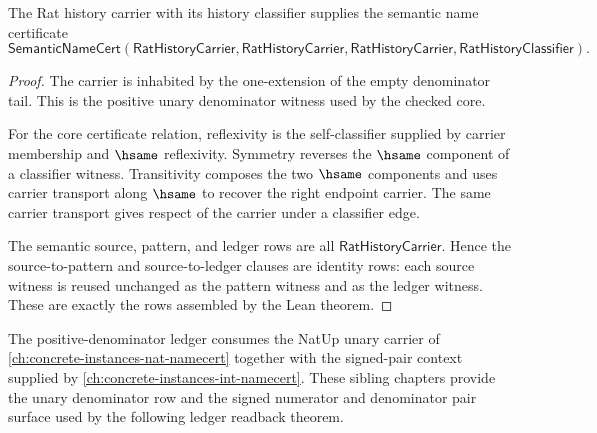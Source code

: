 



\begin{theorem}
\label{thm:rat-history-semantic-name-certificate}
The Rat history carrier with its history classifier supplies the semantic name
certificate
$$
\mathsf{SemanticNameCert}(\mathsf{RatHistoryCarrier},
\mathsf{RatHistoryCarrier},\mathsf{RatHistoryCarrier},
\mathsf{RatHistoryClassifier}).
$$
\end{theorem}
\begin{proof}
The carrier is inhabited by the one-extension of the empty denominator tail.
This is the positive unary denominator witness used by the checked core.

For the core certificate relation, reflexivity is the self-classifier supplied
by carrier membership and $\hsame$ reflexivity. Symmetry reverses the
$\hsame$ component of a classifier witness. Transitivity composes the two
$\hsame$ components and uses carrier transport along $\hsame$ to recover the
right endpoint carrier. The same carrier transport gives respect of the
carrier under a classifier edge.

The semantic source, pattern, and ledger rows are all
$\mathsf{RatHistoryCarrier}$. Hence the source-to-pattern and source-to-ledger
clauses are identity rows: each source witness is reused unchanged as the
pattern witness and as the ledger witness. These are exactly the rows assembled
by the Lean theorem.
\end{proof}

The positive-denominator ledger consumes the NatUp unary carrier of
\autoref{ch:concrete-instances-nat-namecert} together with the signed-pair
context supplied by \autoref{ch:concrete-instances-int-namecert}. These
sibling chapters provide the unary denominator row and the signed numerator
and denominator pair surface used by the following ledger readback theorem.

